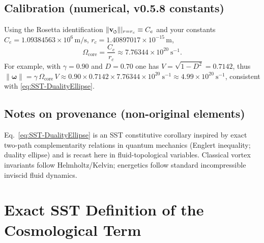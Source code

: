 \documentclass[reprint,aps,onecolumn,nofootinbib]{revtex4-2}
\newcommand{\swirlarrow}{%
    \mathchoice{\mkern-2mu\scriptstyle\boldsymbol{\circlearrowleft}}%
    {\mkern-2mu\scriptstyle\boldsymbol{\circlearrowleft}}%
    {\mkern-2mu\scriptscriptstyle\boldsymbol{\circlearrowleft}}%
    {\mkern-2mu\scriptscriptstyle\boldsymbol{\circlearrowleft}}%
}
\newcommand{\vswirl}{\mathbf{v}_{\swirlarrow}}
\newcommand{\vnorm}{\lVert \vswirl \rVert}               %
\newcommand{\rc}{r_c}                                    %
\providecommand{\rc}{r_c}
\newcommand{\omegaVec}{\boldsymbol{\omega}}
\newcommand{\rhoF}{\rho_{\!f}}     %
\newcommand{\OmegaCore}{\Omega_{\mathrm{core}}}
\begin{document}
    \subsection{Calibration (numerical, v0.5.8 constants)}
    \label{subsec:Calibration-DE}

    Using the Rosetta identification $\vnorm|_{r=\rc}\equiv C_e$ and your constants
    $C_e=1.09384563\times10^{6}\,\mathrm{m/s}$, $\rc=1.40897017\times10^{-15}\,\mathrm{m}$,
    \begin{equation}
    \OmegaCore=\frac{C_e}{\rc} \approx 7.76344\times10^{20}\ \mathrm{s}^{-1}.
    \end{equation}
    For example, with $\gamma=0.90$ and $D=0.70$ one has
    $V=\sqrt{1-D^{2}}=0.7142$, thus $\lVert\omegaVec\rVert=\gamma\,\OmegaCore\,V\approx
    0.90\times 0.7142\times 7.76344\times10^{20}\ \mathrm{s}^{-1}\approx 4.99\times10^{20}\ \mathrm{s}^{-1}$,
    consistent with \eqref{eq:SST-DualityEllipse}.

    \subsection*{Notes on provenance (non-original elements)}
    Eq.~\eqref{eq:SST-DualityEllipse} is an SST constitutive corollary inspired by exact
    two-path complementarity relations in quantum mechanics (Englert inequality; duality ellipse)
    and is recast here in fluid-topological variables. Classical vortex invariants follow
    Helmholtz/Kelvin; energetics follow standard incompressible inviscid fluid dynamics.



    \providecommand{\rhoF}{\rho_{\!f}}
    \providecommand{\rc}{r_c}

    \section{Exact SST Definition of the Cosmological Term}
    \label{sec:SST-Lambda-exact}

\end{document}
